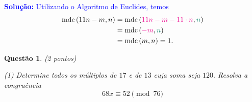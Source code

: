 \documentclass[oneside,a4paper,12pt]{article}
\newcommand{\mdc}{{\rm mdc}}
\newcommand{\negrito}[1]{\mbox{\boldmath{$#1$}}}
\theoremstyle{Colorido}
\theoremstyle{solu}
\theoremstyle{dotlessP}
\newcommand{\solucao}[1]{\textcolor{blue}{\textbf{Solução:} #1}}
\newtheorem{sol}{Questão}
\begin{document}
\solucao{Utilizando o Algoritmo de Euclides, temos 
   \begin{align*}
    \mdc \left( 11 n - m, n \right)&=\mdc \left( \textcolor{Magenta}{11n - m -11 \cdot n}, \textcolor{PineGreen}{n} \right) \\&=\mdc \left( \textcolor{Magenta}{- m}, \textcolor{PineGreen}{n} \right)\\& =\mdc \left( m,n \right) = 1.
    \end{align*}
}
\begin{sol}
\textit{(2 pontos)}
\begin{tasks}[counter-format={(tsk[a])},label-width=3.6ex, label-format = {\bfseries}, column-sep = {20pt}](1)
\task[\textcolor{blue}{$\negrito{(a)} $}] Determine todos os múltiplos de $17$ e de $13$ cuja soma seja $120.$
\task[\textcolor{blue}{$\negrito{(b)} $}] Resolva a congruência
\[
68 x \equiv 52 \pmod{76}
\]
\end{tasks}
\end{sol}
\end{document}
